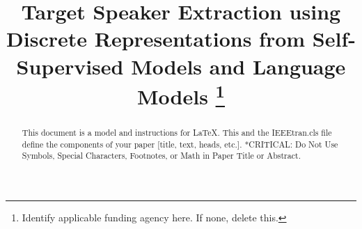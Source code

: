 \documentclass[conference]{IEEEtran}
\begin{document}
\title{Target Speaker Extraction using Discrete Representations from 
Self-Supervised Models and Language Models
\thanks{Identify applicable funding agency here. If none, delete this.}
}

\author{
\and
{}
\and
{}
}

\maketitle

\begin{abstract}
This document is a model and instructions for \LaTeX.
This and the IEEEtran.cls file define the components of your paper [title, text, heads, etc.]. *CRITICAL: Do Not Use Symbols, Special Characters, Footnotes, 
or Math in Paper Title or Abstract. 
\end{abstract}
\end{document}

